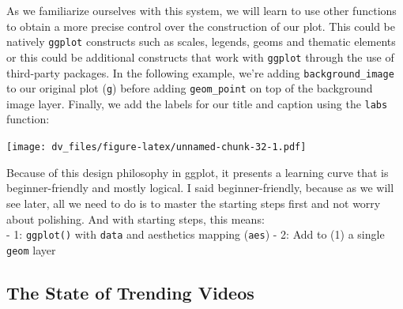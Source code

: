 \documentclass[]{article}
\newenvironment{Shaded}{\begin{snugshade}}{\end{snugshade}}
\newcommand{\DataTypeTok}[1]{\textcolor[rgb]{0.13,0.29,0.53}{#1}}
\newcommand{\FloatTok}[1]{\textcolor[rgb]{0.00,0.00,0.81}{#1}}
\newcommand{\KeywordTok}[1]{\textcolor[rgb]{0.13,0.29,0.53}{\textbf{#1}}}
\newcommand{\NormalTok}[1]{#1}
\newcommand{\OperatorTok}[1]{\textcolor[rgb]{0.81,0.36,0.00}{\textbf{#1}}}
\newcommand{\StringTok}[1]{\textcolor[rgb]{0.31,0.60,0.02}{#1}}
\begin{document}
As we familiarize ourselves with this system, we will learn to use other
functions to obtain a more precise control over the construction of our
plot. This could be natively \texttt{ggplot} constructs such as scales,
legends, geoms and thematic elements or this could be additional
constructs that work with \texttt{ggplot} through the use of third-party
packages. In the following example, we're adding
\texttt{background\_image} to our original plot (\texttt{g}) before
adding \texttt{geom\_point} on top of the background image layer.
Finally, we add the labels for our title and caption using the
\texttt{labs} function:

\begin{Shaded}
\end{Shaded}

\texttt{[image: dv\_files/figure-latex/unnamed-chunk-32-1.pdf]}

Because of this design philosophy in ggplot, it presents a learning
curve that is beginner-friendly and mostly logical. I said
beginner-friendly, because as we will see later, all we need to do is to
master the starting steps first and not worry about polishing. And with
starting steps, this means:\\
- 1: \texttt{ggplot()} with \texttt{data} and aesthetics mapping
(\texttt{aes}) - 2: Add to (1) a single \texttt{geom} layer

\hypertarget{the-state-of-trending-videos}{%
\subsection{The State of Trending
Videos}\label{the-state-of-trending-videos}}
\end{document}
